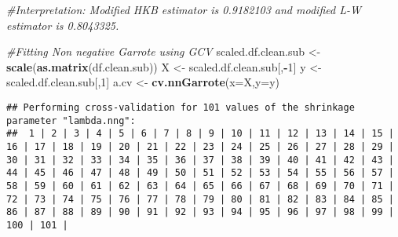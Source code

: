 \documentclass[
]{article}
\newenvironment{Shaded}{\begin{snugshade}}{\end{snugshade}}
\newcommand{\AttributeTok}[1]{\textcolor[rgb]{0.13,0.29,0.53}{#1}}
\newcommand{\CommentTok}[1]{\textcolor[rgb]{0.56,0.35,0.01}{\textit{#1}}}
\newcommand{\DecValTok}[1]{\textcolor[rgb]{0.00,0.00,0.81}{#1}}
\newcommand{\FunctionTok}[1]{\textcolor[rgb]{0.13,0.29,0.53}{\textbf{#1}}}
\newcommand{\NormalTok}[1]{#1}
\newcommand{\OtherTok}[1]{\textcolor[rgb]{0.56,0.35,0.01}{#1}}
\newcommand{\SpecialCharTok}[1]{\textcolor[rgb]{0.81,0.36,0.00}{\textbf{#1}}}
\newcommand{\StringTok}[1]{\textcolor[rgb]{0.31,0.60,0.02}{#1}}
\begin{document}
\begin{Shaded}
\begin{Highlighting}[]
\CommentTok{\#Interpretation: Modified HKB estimator is 0.9182103 and modified L{-}W estimator is 0.8043325. }
\end{Highlighting}
\end{Shaded}

\begin{Shaded}
\begin{Highlighting}[]
\CommentTok{\#Fitting Non negative Garrote using GCV}
\NormalTok{scaled.df.clean.sub }\OtherTok{\textless{}{-}} \FunctionTok{scale}\NormalTok{(}\FunctionTok{as.matrix}\NormalTok{(df.clean.sub))}
\NormalTok{X }\OtherTok{\textless{}{-}}\NormalTok{ scaled.df.clean.sub[,}\SpecialCharTok{{-}}\DecValTok{1}\NormalTok{]}
\NormalTok{y }\OtherTok{\textless{}{-}}\NormalTok{ scaled.df.clean.sub[,}\DecValTok{1}\NormalTok{]}
\NormalTok{a.cv }\OtherTok{\textless{}{-}} \FunctionTok{cv.nnGarrote}\NormalTok{(}\AttributeTok{x=}\NormalTok{X,}\AttributeTok{y=}\NormalTok{y)}
\end{Highlighting}
\end{Shaded}

\begin{verbatim}
## Performing cross-validation for 101 values of the shrinkage parameter "lambda.nng":
##  1 | 2 | 3 | 4 | 5 | 6 | 7 | 8 | 9 | 10 | 11 | 12 | 13 | 14 | 15 | 16 | 17 | 18 | 19 | 20 | 21 | 22 | 23 | 24 | 25 | 26 | 27 | 28 | 29 | 30 | 31 | 32 | 33 | 34 | 35 | 36 | 37 | 38 | 39 | 40 | 41 | 42 | 43 | 44 | 45 | 46 | 47 | 48 | 49 | 50 | 51 | 52 | 53 | 54 | 55 | 56 | 57 | 58 | 59 | 60 | 61 | 62 | 63 | 64 | 65 | 66 | 67 | 68 | 69 | 70 | 71 | 72 | 73 | 74 | 75 | 76 | 77 | 78 | 79 | 80 | 81 | 82 | 83 | 84 | 85 | 86 | 87 | 88 | 89 | 90 | 91 | 92 | 93 | 94 | 95 | 96 | 97 | 98 | 99 | 100 | 101 |
\end{verbatim}

\begin{Shaded}
\end{Shaded}
\end{document}
